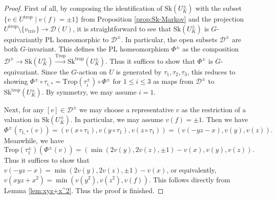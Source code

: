 \documentclass[reqno, 12pt]{amsart}
\theoremstyle{definition}
\newcommand{\cD}{\mathcal{D}}
\newcommand{\Trop}{\mathrm{Trop}}
\newcommand{\trop}{\mathrm{trop}}
\newcommand{\triv}{\mathrm{triv}}
\newcommand{\Sk}{\mathrm{Sk}}
\numberwithin{equation}{section}
\newcommand{\YL}[1]{{\textcolor{blue}{[Yuchen: #1]}}}
\begin{document}
\begin{proof}

First of all, by composing the identification of $\Sk(U_K^{\pm})$ with the subset $\{v\in U^{\trop}\mid v(f) = \pm 1\}$ from Proposition \ref{prop:Sk-Markov} and the projection $U^{\trop}\setminus \{v_{\triv}\} \to \cD(U)$, it is straightforward to see that $\Sk(U_K^{\pm})$ is $G$-equivariantly PL homeomorphic to $\cD^{\pm}$. In particular, the open subsets $\cD^{\pm}$ are both $G$-invariant. This defines the PL homeomorphism $\Phi^{\pm}$ as the composition $\cD^{\pm} \to \Sk(U_K^{\pm}) \xrightarrow{\Trop} \Sk^{\trop}(U_K^{\pm})$. Thus it suffices to show that $\Phi^{\pm}$ is $G$-equivariant. Since the $G$-action on $U$ is generated by $\tau_1, \tau_2, \tau_3$, this reduces  to showing $\Phi^{\pm}\circ \tau_{i,*} = \Trop(\tau_i^{\pm})\circ \Phi^{\pm}$ for $1\leq i\leq 3$ as maps from $\cD^{\pm}$ to $\Sk^{\trop}(U_K^{\pm})$. By symmetry, we may assume $i=1$. 

Next, for any $[v]\in \cD^{\pm}$ we may choose a representative $v$ as the restriction of a valuation in $\Sk(U_K^{\pm})$. In particular, we may assume $v(f) = \pm 1$. Then we have 
\[
\Phi^{\pm}(\tau_{1,*}(v)) = (v(x\circ \tau_1), v(y\circ \tau_1), v(z\circ \tau_1)) = (v(-yz-x), v(y), v(z)).
\]
Meanwhile, we have
\[
\Trop(\tau_1^{\pm})(\Phi^{\pm}(v)) = (\min(2v(y), 2v(z), \pm 1)-v(x), v(y), v(z)).
\]
Thus it suffices to show that $v(-yz-x) = \min(2v(y), 2v(z), \pm 1)-v(x)$, or equivalently, $v(xyz+x^2) =  \min(v(y^2), v(z^2), v(f))$. This follows directly from Lemma \ref{lem:xyz+x^2}. Thus the proof is finished.
\end{proof}

\end{document}
